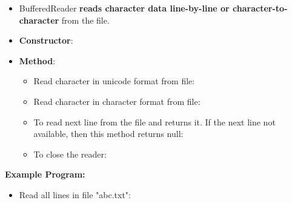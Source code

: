 \setlength{\columnsep}{3pt}
\begin{flushleft}	
	
	\begin{itemize}
		\item BufferedReader \textbf{reads character data line-by-line or character-to-character} from the file. 
		
		\item \textbf{Constructor}:
		\bigskip
	
		\item \textbf{Method}:
		\begin{itemize}
			\item Read character in unicode format from file:
			\bigskip
			\item Read character in character format from file:
			\bigskip
		
			\item To read next line from the file and returns it. If the next line not available, then this method returns null:
			\bigskip
		
			\item To close the reader:
			\bigskip
		
		\end{itemize}
	\end{itemize}
	
	\newpage
	
	\textbf{Example Program:}
	\begin{itemize}
		\item Read all lines in file "abc.txt":
		\bigskip
	
	\end{itemize}
	
	
\end{flushleft}
